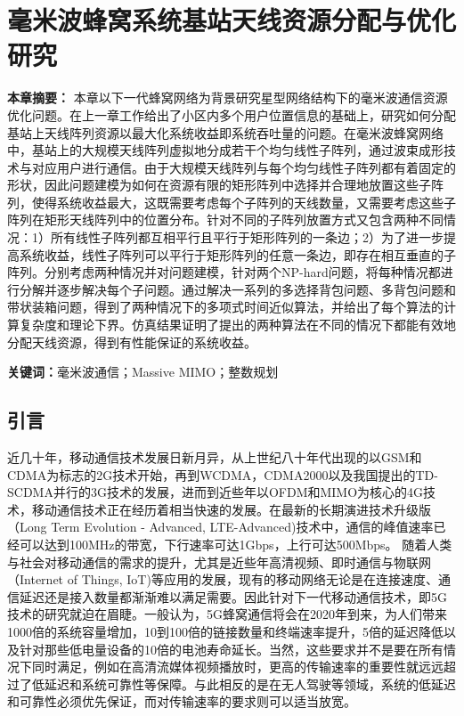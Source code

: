 \chapter{毫米波蜂窝系统基站天线资源分配与优化研究}

\textbf{本章摘要：} 本章以下一代蜂窝网络为背景研究星型网络结构下的毫米波通信资源优化问题。在上一章工作给出了小区内多个用户位置信息的基础上，研究如何分配基站上天线阵列资源以最大化系统收益即系统吞吐量的问题。在毫米波蜂窝网络中，基站上的大规模天线阵列虚拟地分成若干个均匀线性子阵列，通过波束成形技术与对应用户进行通信。由于大规模天线阵列与每个均匀线性子阵列都有着固定的形状，因此问题建模为如何在资源有限的矩形阵列中选择并合理地放置这些子阵列，使得系统收益最大，这既需要考虑每个子阵列的天线数量，又需要考虑这些子阵列在矩形天线阵列中的位置分布。针对不同的子阵列放置方式又包含两种不同情况：1）所有线性子阵列都互相平行且平行于矩形阵列的一条边；2）为了进一步提高系统收益，线性子阵列可以平行于矩形阵列的任意一条边，即存在相互垂直的子阵列。分别考虑两种情况并对问题建模，针对两个NP-hard问题，将每种情况都进行分解并逐步解决每个子问题。通过解决一系列的多选择背包问题、多背包问题和带状装箱问题，得到了两种情况下的多项式时间近似算法，并给出了每个算法的计算复杂度和理论下界。仿真结果证明了提出的两种算法在不同的情况下都能有效地分配天线资源，得到有性能保证的系统收益。

\textbf{关键词：}毫米波通信；Massive MIMO；整数规划

\section{引言}
近几十年，移动通信技术发展日新月异，从上世纪八十年代出现的以GSM和CDMA为标志的2G技术开始，再到WCDMA，CDMA2000以及我国提出的TD-SCDMA并行的3G技术的发展，进而到近些年以OFDM和MIMO为核心的4G技术，移动通信技术正在经历着相当快速的发展。在最新的长期演进技术升级版（Long Term Evolution - Advanced, LTE-Advanced)技术中，通信的峰值速率已经可以达到100MHz的带宽，下行速率可达1Gbps，上行可达500Mbps。
随着人类与社会对移动通信的需求的提升，尤其是近些年高清视频、即时通信与物联网（Internet of Things, IoT)等应用的发展，现有的移动网络无论是在连接速度、通信延迟还是接入数量都渐渐难以满足需要。因此针对下一代移动通信技术，即5G技术的研究就迫在眉睫。一般认为\cite{andrews2014will}，5G蜂窝通信将会在2020年到来，为人们带来1000倍的系统容量增加，10到100倍的链接数量和终端速率提升，5倍的延迟降低以及针对那些低电量设备的10倍的电池寿命延长。当然，这些要求并不是要在所有情况下同时满足，例如在高清流媒体视频播放时，更高的传输速率的重要性就远远超过了低延迟和系统可靠性等保障。与此相反的是在无人驾驶等领域，系统的低延迟和可靠性必须优先保证，而对传输速率的要求则可以适当放宽。

